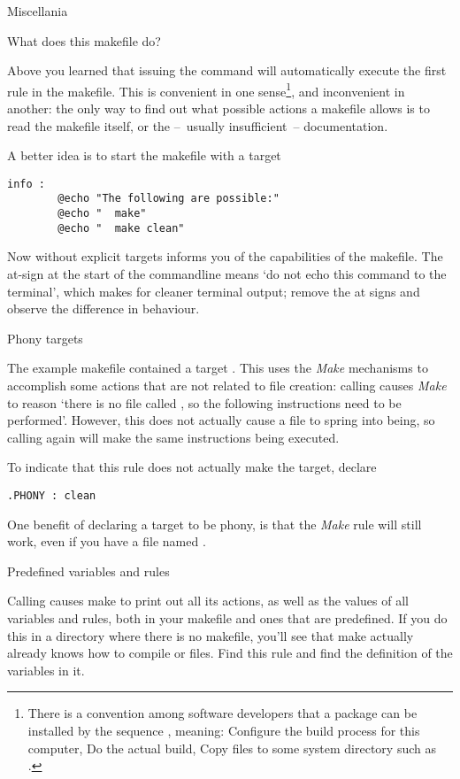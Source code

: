  {Miscellania}

 {What does this makefile do?}

Above you learned that issuing the  command will automatically
execute the first rule in the makefile. This is convenient in one
sense\footnote {There is a convention among software developers that a
  package can be installed by the sequence , meaning: Configure the build process for this
  computer, Do the actual build, Copy files to some system directory
  such as .}, and inconvenient in another: the only way to
find out what possible actions a makefile allows is to read the
makefile itself, or the --~usually insufficient~-- documentation.

A better idea is to start the makefile with a target
\begin{verbatim}
info :
        @echo "The following are possible:"
        @echo "  make"
        @echo "  make clean"
\end{verbatim}
Now  without explicit targets informs you of the capabilities
of the makefile. The at-sign at the start of the commandline means `do
not echo this command to the terminal', which makes for cleaner
terminal output; remove the at signs and observe the difference in
behaviour.

 {Phony targets}

The example makefile contained a target . This uses
the \emph{Make} mechanisms to accomplish some actions that are not
related to file creation: calling  causes \emph{Make} to
reason `there is no file called , so the following
instructions need to be performed'. However, this does not actually
cause a file  to spring into being, so calling 
again will make the same instructions being executed.

To indicate that this rule does not actually make the target, declare
\begin{verbatim}
.PHONY : clean
\end{verbatim}
One benefit of declaring a target to be phony, is that the \emph{Make}
rule will still work, even if you have a file named .

 {Predefined variables and rules}

Calling  causes make to print out all its
actions, as well as the values of all variables and rules, both in
your makefile and ones that are predefined. If you do this in a
directory where there is no makefile, you'll see that make actually
already knows how to compile  or  files. Find this rule
and find the definition of the variables in it.

